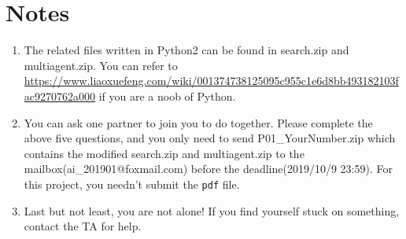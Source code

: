 \documentclass[a4paper, 11pt]{article}
\begin{document}
\section{Notes}
\begin{enumerate}\setlength{\itemsep}{-\itemsep}
  \item The related files written in Python2 can be found in \textsf{search.zip} and \textsf{multiagent.zip}. You can refer to \url{https://www.liaoxuefeng.com/wiki/001374738125095c955c1e6d8bb493182103fac9270762a000} if you are a noob of Python.
\item You can ask one partner to join you to do together. Please complete the above five questions, and you only need to send \textsf{P01\_YourNumber.zip} which contains the modified \textsf{search.zip} and \textsf{multiagent.zip} to the mailbox(\textsf{ai\_201901@foxmail.com}) before the deadline(2019/10/9 23:59). For this project, you needn't submit the \texttt{pdf} file.
\item Last but not least, you are not alone! If you find yourself stuck on something, contact the TA for help.
  
\end{enumerate}
  
\end{document}
